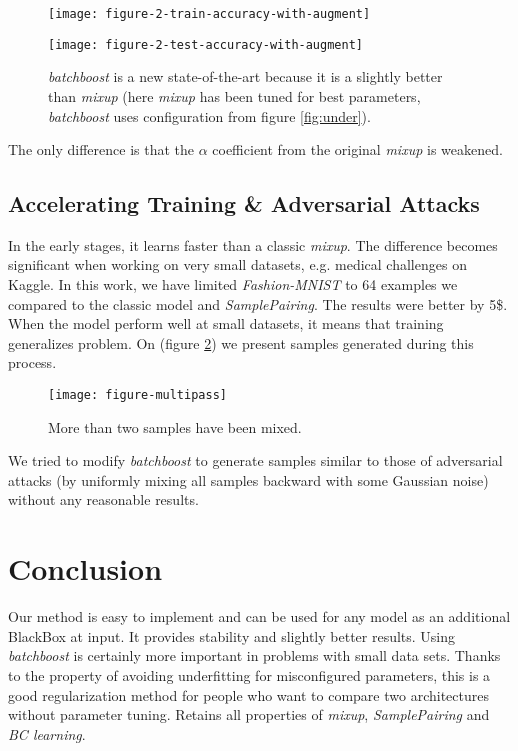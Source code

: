 \documentclass{article}
\begin{document}
\begin{figure}[H]
  \centering
\begin{minipage}{.3\textwidth}
  \hspace{-0.65cm}
  \texttt{[image: figure-2-train-accuracy-with-augment]}
\end{minipage}
\begin{minipage}{.65\textwidth}\vspace{-0.00cm}\hspace{0.865cm}
	\texttt{[image: figure-2-test-accuracy-with-augment]}
\end{minipage}\caption{\emph{batchboost} is a new state-of-the-art because it is a slightly
	better than \emph{mixup} (here \emph{mixup} has been tuned for best
	parameters, \emph{batchboost} uses configuration from figure \ref{fig:under}).}
\label{fig:over}
\end{figure}

The only difference is that the $\alpha$ coefficient from the original
\emph{mixup} is weakened.

\subsection{Accelerating Training \& Adversarial Attacks}
\label{sec:attacks}

In the early stages, it learns faster than a classic \emph{mixup}.
The difference becomes significant when working on very small datasets, e.g.
medical challenges on Kaggle. In this work, we have limited \emph{Fashion-MNIST}
to 64 examples we compared to the classic model and \emph{SamplePairing}. The results were better by 5\$.
When the model perform well at small datasets, it means that training
generalizes problem. On (figure \ref{fig:multipass}) we present samples
generated during this process.

\begin{figure}[H]
  \centering
  \texttt{[image: figure-multipass]}
  \caption{More than two samples have been mixed.}
  \label{fig:multipass}
\end{figure}

We tried to modify \emph{batchboost} to generate samples similar to those of
adversarial attacks (by uniformly mixing all samples backward with some Gaussian
noise) without any reasonable results.

\section{Conclusion}
\label{sec:conclusion}

Our method is easy to implement and can be used for any
model as an additional BlackBox at input.
It provides stability and slightly better results.
Using \emph{batchboost} is certainly more important in problems with small data sets.
Thanks to the property of avoiding underfitting for misconfigured parameters,
this is a good regularization method for people who want to compare two
architectures without parameter tuning.
Retains all properties of \emph{mixup}, \emph{SamplePairing} and \emph{BC learning}.



\end{document}
